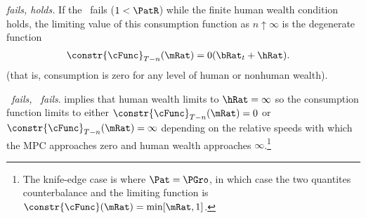 \documentclass[\econtexRoot/BufferStockTheory]{subfiles}
\begin{document}
\hypertarget{cnclGICRawcnclRICFHWC}{}
\textit{{\RIC} fails, {\FHWC} holds.} If the \RIC~fails ($1 < \PatR$) while the finite human wealth condition
holds, the limiting value of this consumption function as $n \uparrow
\infty$ is the degenerate function
\begin{equation}\begin{gathered}\begin{aligned}
  \constr{\cFunc}_{T-n}(\mRat)  & = 0 (\bRat_{t}+\hRat).
\end{aligned}\end{gathered}\end{equation}
(that is, consumption is zero for any level of human or nonhuman wealth).

\hypertarget{cnclGICRawcnclRICcnclFHWC}{}
\textit{{\RIC}~fails, {\FHWC}~fails}. {\cncl{\FHWC}} implies that human wealth limits to $\hRat =
\infty$ so the consumption function limits to either
$\constr{\cFunc}_{T-n}(\mRat) = 0$ or
$\constr{\cFunc}_{T-n}(\mRat) = \infty$ depending on the relative
speeds with which the MPC approaches zero and human wealth approaches
$\infty$.\footnote{The knife-edge case is where $\Pat = \PGro$, in
  which case the two quantites counterbalance and the limiting
  function is $\constr{\cFunc}(\mRat)=\min[\mRat,1]$.}

\let\TableWidth\relax
{\newlength\TableWidth}
\end{document}
